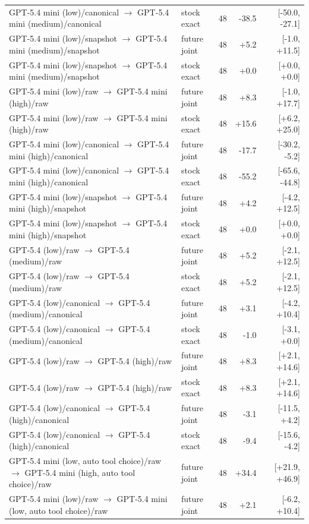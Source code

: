 \begin{table}[htbp]
{\begin{tabular}{lllrr}
GPT-5.4 mini (low)/canonical $\to$ GPT-5.4 mini (medium)/canonical & stock exact & 48 & -38.5 & [-50.0, -27.1] \\
GPT-5.4 mini (low)/snapshot $\to$ GPT-5.4 mini (medium)/snapshot & future joint & 48 & +5.2 & [-1.0, +11.5] \\
GPT-5.4 mini (low)/snapshot $\to$ GPT-5.4 mini (medium)/snapshot & stock exact & 48 & +0.0 & [+0.0, +0.0] \\
GPT-5.4 mini (low)/raw $\to$ GPT-5.4 mini (high)/raw & future joint & 48 & +8.3 & [-1.0, +17.7] \\
GPT-5.4 mini (low)/raw $\to$ GPT-5.4 mini (high)/raw & stock exact & 48 & +15.6 & [+6.2, +25.0] \\
GPT-5.4 mini (low)/canonical $\to$ GPT-5.4 mini (high)/canonical & future joint & 48 & -17.7 & [-30.2, -5.2] \\
GPT-5.4 mini (low)/canonical $\to$ GPT-5.4 mini (high)/canonical & stock exact & 48 & -55.2 & [-65.6, -44.8] \\
GPT-5.4 mini (low)/snapshot $\to$ GPT-5.4 mini (high)/snapshot & future joint & 48 & +4.2 & [-4.2, +12.5] \\
GPT-5.4 mini (low)/snapshot $\to$ GPT-5.4 mini (high)/snapshot & stock exact & 48 & +0.0 & [+0.0, +0.0] \\
GPT-5.4 (low)/raw $\to$ GPT-5.4 (medium)/raw & future joint & 48 & +5.2 & [-2.1, +12.5] \\
GPT-5.4 (low)/raw $\to$ GPT-5.4 (medium)/raw & stock exact & 48 & +5.2 & [-2.1, +12.5] \\
GPT-5.4 (low)/canonical $\to$ GPT-5.4 (medium)/canonical & future joint & 48 & +3.1 & [-4.2, +10.4] \\
GPT-5.4 (low)/canonical $\to$ GPT-5.4 (medium)/canonical & stock exact & 48 & -1.0 & [-3.1, +0.0] \\
GPT-5.4 (low)/raw $\to$ GPT-5.4 (high)/raw & future joint & 48 & +8.3 & [+2.1, +14.6] \\
GPT-5.4 (low)/raw $\to$ GPT-5.4 (high)/raw & stock exact & 48 & +8.3 & [+2.1, +14.6] \\
GPT-5.4 (low)/canonical $\to$ GPT-5.4 (high)/canonical & future joint & 48 & -3.1 & [-11.5, +4.2] \\
GPT-5.4 (low)/canonical $\to$ GPT-5.4 (high)/canonical & stock exact & 48 & -9.4 & [-15.6, -4.2] \\
GPT-5.4 mini (low, auto tool choice)/raw $\to$ GPT-5.4 mini (high, auto tool choice)/raw & future joint & 48 & +34.4 & [+21.9, +46.9] \\
GPT-5.4 mini (low)/raw $\to$ GPT-5.4 mini (low, auto tool choice)/raw & future joint & 48 & +2.1 & [-6.2, +10.4] \\

\end{tabular}}
\end{table}
